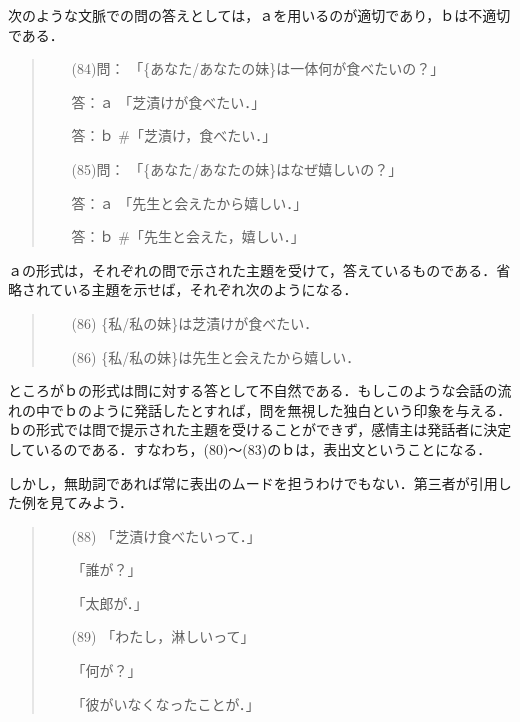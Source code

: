 次のような文脈での問の答えとしては，ａを用いるのが適切であり，ｂは不適切
である．

\vspace{0.3cm}
\begin{quote}
\begin{itemize}
 \item[(84)問：　] 「\{あなた/あなたの妹\}は一体何が食べたいの？」
 \item[　　答：ａ ]  「芝漬けが食べたい．」
 \item[　　答：ｂ] \#「芝漬け，食べたい．」
 \item[(85)問：　] 「\{あなた/あなたの妹\}はなぜ嬉しいの？」
 \item[　　答：ａ ]  「先生と会えたから嬉しい．」
 \item[　　答：ｂ] \#「先生と会えた，嬉しい．」
\end{itemize}
\end{quote}
\vspace{0.3cm}

ａの形式は，それぞれの問で示された主題を受けて，答えているものである．省
略されている主題を示せば，それぞれ次のようになる．

\vspace{0.3cm}
\begin{quote}
\begin{itemize}
 \item[(86)] \{私/私の妹\}は芝漬けが食べたい．
 \item[(86)] \{私/私の妹\}は先生と会えたから嬉しい．
\end{itemize}
\end{quote}
\vspace{0.3cm}

ところがｂの形式は問に対する答として不自然である．もしこのような会話の流
れの中でｂのように発話したとすれば，問を無視した独白という印象を与える．
ｂの形式では問で提示された主題を受けることができず，感情主は発話者に決定
しているのである．すなわち，(80)〜(83)のｂは，表出文ということになる．

しかし，無助詞であれば常に表出のムードを担うわけでもない．第三者が引用し
た例を見てみよう．

\vspace{0.3cm}
\begin{quote}
\begin{itemize}
 \item[(88)] 「芝漬け食べたいって．」
 \item[　　] 「誰が？」
 \item[　　] 「太郎が．」
 \item[(89)] 「わたし，淋しいって」
 \item[　　] 「何が？」
 \item[　　] 「彼がいなくなったことが．」
\end{itemize}
\end{quote}
\vspace{0.3cm}

